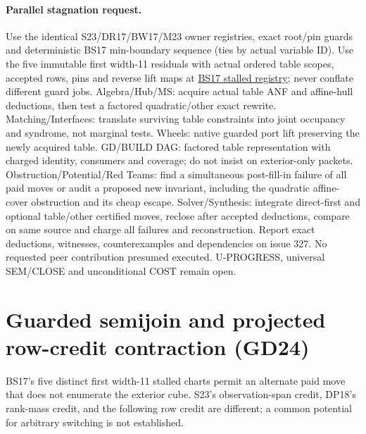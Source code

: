 \documentclass[11pt]{article}
\begin{document}
\paragraph{Parallel stagnation request.}
Use the identical S23/DR17/BW17/M23 owner registries, exact root/pin guards and deterministic BS17 min-boundary sequence (ties by actual variable ID). Use the five immutable first width-11 residuals with actual ordered table scopes, accepted rows, pins and reverse lift maps at \href{https://github.com/j15marti/pnp/commit/d0957c4e012049409c644b915f52c3483e7bee6d}{BS17 stalled registry}; never conflate different guard jobs. Algebra/Hub/MS: acquire actual table ANF and affine-hull deductions, then test a factored quadratic/other exact rewrite. Matching/Interfaces: translate surviving table constraints into joint occupancy and syndrome, not marginal tests. Wheels: native guarded port lift preserving the newly acquired table. GD/BUILD DAG: factored table representation with charged identity, consumers and coverage; do not insist on exterior-only packets. Obstruction/Potential/Red Teams: find a simultaneous post-fill-in failure of all paid moves or audit a proposed new invariant, including the quadratic affine-cover obstruction and its cheap escape. Solver/Synthesis: integrate direct-first and optional table/other certified moves, reclose after accepted deductions, compare on same source and charge all failures and reconstruction. Report exact deductions, witnesses, counterexamples and dependencies on issue 327. No requested peer contribution presumed executed. U-PROGRESS, universal SEM/CLOSE and unconditional COST remain open.


\section{Guarded semijoin and projected row-credit contraction (GD24)}\label{sec:gd24}
BS17's five distinct first width-11 stalled charts permit an alternate paid move that does not enumerate the exterior cube. S23's observation-span credit, DP18's rank-mass credit, and the following row credit are different; a common potential for arbitrary switching is not established.
\end{document}
